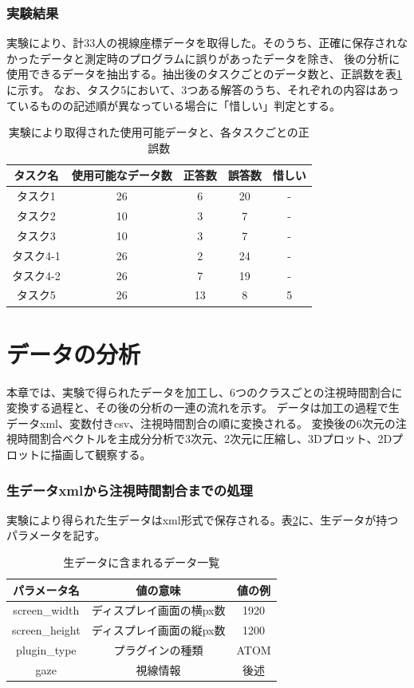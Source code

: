 \documentclass[paper=a4paper,fontsize=11pt]{jlreq}
\begin{document}
  \section{実験結果}
    実験により、計33人の視線座標データを取得した。そのうち、正確に保存されなかったデータと測定時のプログラムに誤りがあったデータを除き、
    後の分析に使用できるデータを抽出する。抽出後のタスクごとのデータ数と、正誤数を表\ref{data_num}に示す。
    なお、タスク5において、3つある解答のうち、それぞれの内容はあっているものの記述順が異なっている場合に「惜しい」判定とする。\\
    \begin{table}[h]
      \centering
      \caption{実験により取得された使用可能データと、各タスクごとの正誤数}
      \begin{tabular}{|c|c|c|c|c|}
        \hline
        タスク名&使用可能なデータ数&正答数&誤答数&惜しい\\ \hline
        タスク1&26&6&20&-\\ \hline
        タスク2&10&3&7&-\\ \hline
        タスク3&10&3&7&-\\ \hline
        タスク4-1&26&2&24&-\\ \hline
        タスク4-2&26&7&19&-\\ \hline
        タスク5&26&13&8&5\\ \hline
      \end{tabular}
      \label{data_num}
    \end{table}
   \FloatBarrier


\clearpage

\part{データの分析}
  本章では、実験で得られたデータを加工し、6つのクラスごとの注視時間割合に変換する過程と、その後の分析の一連の流れを示す。
  データは加工の過程で生データxml、変数付きcsv、注視時間割合の順に変換される。
  変換後の6次元の注視時間割合ベクトルを主成分分析で3次元、2次元に圧縮し、3Dプロット、2Dプロットに描画して観察する。

  \section{生データxmlから注視時間割合までの処理}
    実験により得られた生データはxml形式で保存される。表\ref{n_data}に、生データが持つパラメータを記す。
    \begin{table}[h]
      \centering
      \caption{生データに含まれるデータ一覧}
      \begin{tabular}{|c|c|c|}
        \hline
        パラメータ名 & 値の意味 & 値の例 \\ \hline
        screen\_width & ディスプレイ画面の横px数 & 1920 \\ \hline
        screen\_height & ディスプレイ画面の縦px数 & 1200 \\ \hline
        plugin\_type & プラグインの種類 & ATOM \\ \hline
        gaze & 視線情報 & 後述 \\ \hline
      \end{tabular}
      \label{n_data}
    \end{table}
   \FloatBarrier
\end{document}
